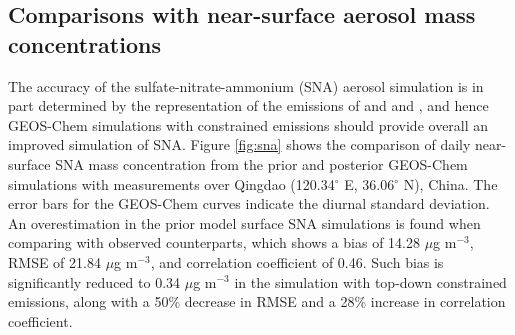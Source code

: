  \subsection{Comparisons with near-surface aerosol mass concentrations}

 The accuracy of the sulfate-nitrate-ammonium (SNA) aerosol simulation
 is in part determined by the representation of the emissions of  and  and ,
 and hence GEOS-Chem simulations with constrained emissions should
 provide overall an improved simulation of SNA.
 Figure \ref{fig:sna} shows the comparison of daily near-surface SNA mass concentration
 from the prior and posterior GEOS-Chem simulations with measurements
 over Qingdao (120.34$^{\circ}$ E, 36.06$^{\circ}$ N), China.
 The error bars for the GEOS-Chem curves indicate the diurnal standard deviation.
 An overestimation in the prior model surface SNA simulations is found
 when comparing with observed counterparts, which shows a bias of 14.28 $\mu$g m$^{-3}$,
 RMSE of 21.84 $\mu$g m$^{-3}$, and correlation coefficient of 0.46.
 Such bias is significantly reduced to 0.34 $\mu$g m$^{-3}$
 in the simulation with top-down constrained emissions,
 along with a 50\% decrease in RMSE and a 28\% increase in correlation coefficient.

